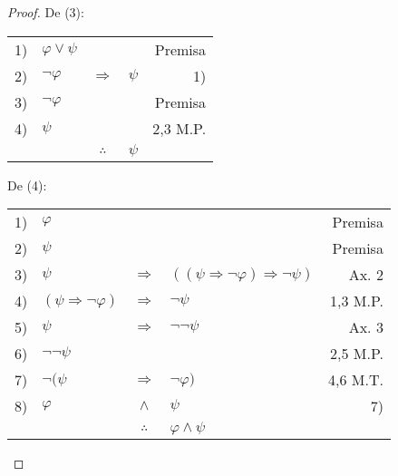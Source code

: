 \documentclass[12pt]{report}
\theoremstyle{largebreak}
\begin{document}
\begin{proof}
        De (3):
        \begin{center}
            \begin{tabular}{l l c l r}
                1) & $\varphi\lor\psi$ & & & Premisa \\
                2) & $\neg\varphi$ & $\Rightarrow$ & $\psi$ & 1) \\
                3) & $\neg\varphi$ & & & Premisa\\
                4) & $\psi$ & & & 2,3 M.P.\\
                \hline
                & & $\therefore$ & $\psi$ & \\
            \end{tabular}
        \end{center}

        De (4):
        \begin{center}
            \begin{tabular}{l l c l r}
                1) & $\varphi$ &  &  & Premisa \\
                2) & $\psi$ &  &  & Premisa \\
                3) & $\psi$ & $\Rightarrow$ & $((\psi\Rightarrow\neg\varphi)\Rightarrow\neg\psi)$ & Ax. 2 \\
                4) & $(\psi\Rightarrow\neg\varphi)$ & $\Rightarrow$ & $\neg\psi$ & 1,3 M.P. \\
                5) & $\psi$ & $\Rightarrow$ & $\neg\neg\psi$ & Ax. 3 \\
                6) & $\neg\neg\psi$ &  &  & 2,5 M.P. \\
                7) & $\neg(\psi$ & $\Rightarrow$ & $\neg\varphi)$ & 4,6 M.T. \\
                8) & $\varphi$ & $\land$ & $\psi$ & 7) \\
                \hline
                & & $\therefore$ & $\varphi\land\psi$  & \\
            \end{tabular}
        \end{center}

    \end{proof}
\end{document}
